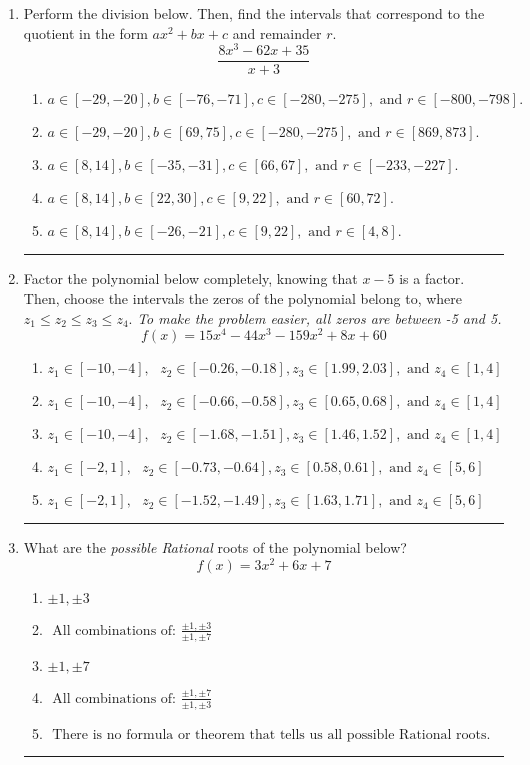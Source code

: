 \documentclass[14pt]{extbook}
\newcommand{\litem}[1]{\item#1\hspace*{-1cm}\rule{\textwidth}{0.4pt}}
\begin{document}
\begin{enumerate}
{\begin{enumerate}[label=\Alph*.]
\end{enumerate} }
\litem{
Perform the division below. Then, find the intervals that correspond to the quotient in the form $ax^2+bx+c$ and remainder $r$.\[ \frac{8x^{3} -62 x + 35}{x + 3} \]\begin{enumerate}[label=\Alph*.]
\item \( a \in [-29, -20], b \in [-76, -71], c \in [-280, -275], \text{ and } r \in [-800, -798]. \)
\item \( a \in [-29, -20], b \in [69, 75], c \in [-280, -275], \text{ and } r \in [869, 873]. \)
\item \( a \in [8, 14], b \in [-35, -31], c \in [66, 67], \text{ and } r \in [-233, -227]. \)
\item \( a \in [8, 14], b \in [22, 30], c \in [9, 22], \text{ and } r \in [60, 72]. \)
\item \( a \in [8, 14], b \in [-26, -21], c \in [9, 22], \text{ and } r \in [4, 8]. \)

\end{enumerate} }
\litem{
Factor the polynomial below completely, knowing that $x -5$ is a factor. Then, choose the intervals the zeros of the polynomial belong to, where $z_1 \leq z_2 \leq z_3 \leq z_4$. \textit{To make the problem easier, all zeros are between -5 and 5.}\[ f(x) = 15x^{4} -44 x^{3} -159 x^{2} +8 x + 60 \]\begin{enumerate}[label=\Alph*.]
\item \( z_1 \in [-10, -4], \text{   }  z_2 \in [-0.26, -0.18], z_3 \in [1.99, 2.03], \text{   and   } z_4 \in [1, 4] \)
\item \( z_1 \in [-10, -4], \text{   }  z_2 \in [-0.66, -0.58], z_3 \in [0.65, 0.68], \text{   and   } z_4 \in [1, 4] \)
\item \( z_1 \in [-10, -4], \text{   }  z_2 \in [-1.68, -1.51], z_3 \in [1.46, 1.52], \text{   and   } z_4 \in [1, 4] \)
\item \( z_1 \in [-2, 1], \text{   }  z_2 \in [-0.73, -0.64], z_3 \in [0.58, 0.61], \text{   and   } z_4 \in [5, 6] \)
\item \( z_1 \in [-2, 1], \text{   }  z_2 \in [-1.52, -1.49], z_3 \in [1.63, 1.71], \text{   and   } z_4 \in [5, 6] \)

\end{enumerate} }
\litem{
What are the \textit{possible Rational} roots of the polynomial below?\[ f(x) = 3x^{2} +6 x + 7 \]\begin{enumerate}[label=\Alph*.]
\item \( \pm 1,\pm 3 \)
\item \( \text{ All combinations of: }\frac{\pm 1,\pm 3}{\pm 1,\pm 7} \)
\item \( \pm 1,\pm 7 \)
\item \( \text{ All combinations of: }\frac{\pm 1,\pm 7}{\pm 1,\pm 3} \)
\item \( \text{ There is no formula or theorem that tells us all possible Rational roots.} \)

\end{enumerate} }
\end{enumerate}
\end{document}
